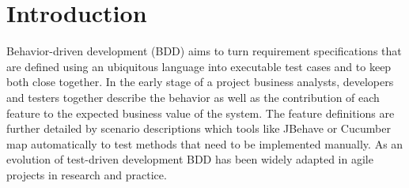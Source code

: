 \documentclass{sig-alternate-05-2015}
\begin{document}
%
%
\printccsdesc






\section{Introduction}
Behavior-driven development (BDD) aims to turn requirement specifications that are defined using an ubiquitous language into executable test cases and to keep both close together.
In the early stage of a project business analysts, developers and testers together describe the behavior as well as the contribution of each feature to the expected business value of the system.
The feature definitions are further detailed by scenario descriptions which tools like JBehave or Cucumber map automatically to test methods that need to be implemented manually.
As an evolution of test-driven development BDD has been widely adapted in agile projects in research and practice.
\end{document}
